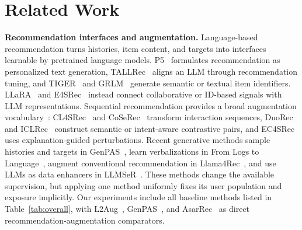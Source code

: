 \section{Related Work}
\label{sec:related-work}

\textbf{Recommendation interfaces and augmentation.} Language-based recommendation turns histories, item content, and targets into interfaces learnable by pretrained language models. P5~\citep{geng2022p5} formulates recommendation as personalized text generation, TALLRec~\citep{bao2023tallrec} aligns an LLM through recommendation tuning, and TIGER~\citep{rajput2023tiger} and GRLM~\citep{zhang2026grlm} generate semantic or textual item identifiers. LLaRA~\citep{liao2024llara} and E4SRec~\citep{li2023e4srec} instead connect collaborative or ID-based signals with LLM representations. Sequential recommendation provides a broad augmentation vocabulary~\citep{dang2024survey}: CL4SRec~\citep{xie2022cl4rec} and CoSeRec~\citep{liu2021coserec} transform interaction sequences, DuoRec~\citep{qiu2022duorec} and ICLRec~\citep{chen2022iclrec} construct semantic or intent-aware contrastive pairs, and EC4SRec~\citep{wang2022ec4srec} uses explanation-guided perturbations. Recent generative methods sample histories and targets in GenPAS~\citep{lee2025genpas}, learn verbalizations in From Logs to Language~\citep{shi2026verbalization}, augment conventional recommendation in Llama4Rec~\citep{luo2024llama4rec}, and use LLMs as data enhancers in LLMSeR~\citep{wang2025llmser}. These methods change the available supervision, but applying one method uniformly fixes its user population and exposure implicitly. Our experiments include all baseline methods listed in Table~\ref{tab:overall}, with L2Aug~\citep{wang2022l2aug}, GenPAS~\citep{lee2025genpas}, and AsarRec~\citep{zhang2026asarrec} as direct recommendation-augmentation comparators.

